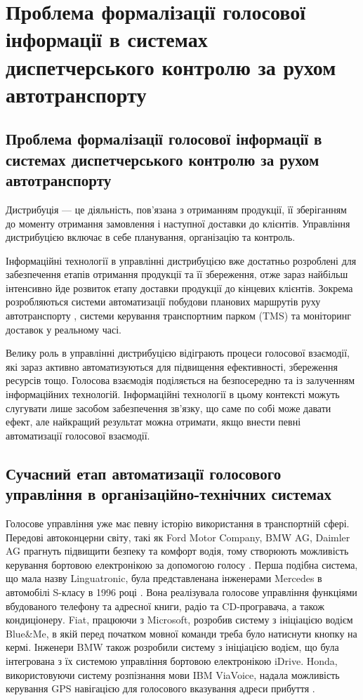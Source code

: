 \chapter{Проблема формалізації голосової інформації в системах диспетчерського контролю за рухом автотранспорту} \label{chapt1}

\section{Проблема формалізації голосової інформації в системах диспетчерського контролю за рухом автотранспорту} \label{sect1_1}

Дистрибуція — це діяльність, пов'язана з отриманням продукції, її зберіганням до моменту отримання замовлення і наступної доставки до клієнтів. Управління дистрибуцією включає в себе планування, організацію та контроль.

Інформаційні технології в управлінні дистрибуцією вже достатньо розроблені для забезпечення етапів отримання продукції та її збереження, отже зараз найбільш інтенсивно йде розвиток етапу доставки продукції до кінцевих клієнтів. Зокрема розробляються системи автоматизації побудови планових маршрутів руху автотранспорту \cite{art1}, системи керування транспортним парком (TMS) та моніторинг доставок у реальному часі.

Велику роль в управлінні дистрибуцією відіграють процеси голосової взаємодії, які зараз активно автоматизуються для підвищення ефективності, збереження ресурсів тощо. Голосова взаємодія поділяється на безпосередню та із залученням інформаційних технологій. Інформаційні технології в цьому контексті можуть слугувати лише засобом забезпечення зв’язку, що саме по собі може давати ефект, але найкращий результат можна отримати, якщо внести певні автоматизації голосової взаємодії.

\section{Сучасний етап автоматизації голосового управління в організаційно-технічних системах} \label{sect1_2}

Голосове управління уже має певну історію використання в транспортній сфері. Передові автоконцерни світу, такі як Ford Motor Company, BMW AG, Daimler AG прагнуть підвищити безпеку та комфорт водія, тому створюють можливість керування бортовою електронікою за допомогою голосу \cite{Kravchenko_2009}. Перша подібна система, що мала назву Linguatronic, була представленана інженерами Mercedes в автомобілі S-класу в 1996 році \cite{Heisterkamp_2001}. Вона реалізувала голосове управління функціями вбудованого телефону та адресної книги, радіо та CD-програвача, а також кондиціонеру. Fiat, працюючи з Microsoft, розробив систему з ініціацією водієм Blue\&Me, в якій перед початком мовної команди треба було натиснути кнопку на кермі. Інженери BMW також розробили систему з ініціацією водієм, що була інтегрована з їх системою управління бортовою електронікою iDrive. Honda, використовуючи систему розпізнання мови IBM ViaVoice, надала можливість керування GPS навігацією для голосового вказування адреси прибуття \cite{Jonsson_2009}.

